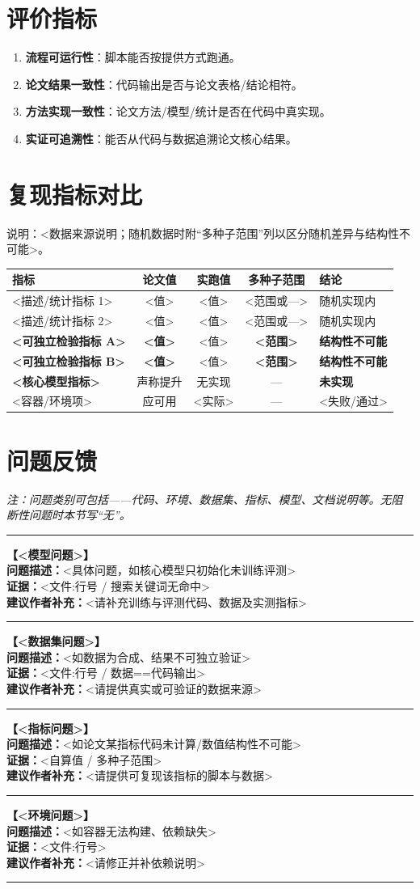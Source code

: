 \documentclass[11pt]{article}
\newcommand{\issue}[4]{\par\smallskip\noindent\textbf{【#1】}\\
  \textbf{问题描述：}#2\\ \textbf{证据：}#3\\ \textbf{建议作者补充：}#4
  \par\smallskip\hrule\smallskip}
\begin{document}
\section{评价指标}
\begin{enumerate}[leftmargin=2em]
  \item \textbf{流程可运行性}：脚本能否按提供方式跑通。
  \item \textbf{论文结果一致性}：代码输出是否与论文表格/结论相符。
  \item \textbf{方法实现一致性}：论文方法/模型/统计是否在代码中真实现。
  \item \textbf{实证可追溯性}：能否从代码与数据追溯论文核心结果。
\end{enumerate}

\section{复现指标对比}
\noindent\small 说明：<数据来源说明；随机数据时附“多种子范围”列以区分随机差异与结构性不可能>。
\begin{center}\begin{longtable}{p{3.9cm} c c c p{2.7cm}}
\toprule
指标 & 论文值 & 实跑值 & 多种子范围 & 结论 \\ \midrule \endhead
<描述/统计指标 1> & <值> & <值> & <范围或—> & 随机实现内 \\
<描述/统计指标 2> & <值> & <值> & <范围或—> & 随机实现内 \\
\textbf{<可独立检验指标 A>} & \textbf{<值>} & <值> & \textbf{<范围>} & \textbf{结构性不可能} \\
\textbf{<可独立检验指标 B>} & \textbf{<值>} & <值> & \textbf{<范围>} & \textbf{结构性不可能} \\
\textbf{<核心模型指标>} & 声称提升 & 无实现 & --- & \textbf{未实现} \\
<容器/环境项> & 应可用 & <实际> & --- & <失败/通过> \\
\bottomrule
\end{longtable}\end{center}

\section{问题反馈}
\noindent\textit{注：问题类别可包括——代码、环境、数据集、指标、模型、文档说明等。无阻断性问题时本节写“无”。}
\medskip\hrule\smallskip
\issue{<模型问题>}{<具体问题，如核心模型只初始化未训练评测>}{<文件:行号 / 搜索关键词无命中>}{<请补充训练与评测代码、数据及实测指标>}
\issue{<数据集问题>}{<如数据为合成、结果不可独立验证>}{<文件:行号 / 数据==代码输出>}{<请提供真实或可验证的数据来源>}
\issue{<指标问题>}{<如论文某指标代码未计算/数值结构性不可能>}{<自算值 / 多种子范围>}{<请提供可复现该指标的脚本与数据>}
\issue{<环境问题>}{<如容器无法构建、依赖缺失>}{<文件:行号>}{<请修正并补依赖说明>}
\end{document}
